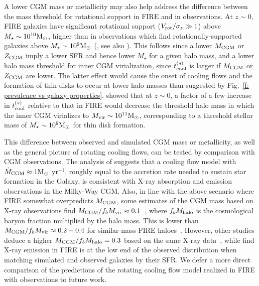 \documentclass[fleqn,usenatbib]{mnras}
\newcommand{\Mdot}{\dot{M}}
\newcommand{\msun}{{\rm M}_\odot}
\begin{document}
A lower CGM mass or metallicity may also help address the difference between the mass threshold for rotational support in FIRE and in observations. 
At $z\sim0$, FIRE galaxies have significant rotational support ($V_{\rm rot}/\sigma_z \gg 1$) above $M_\star\sim10^{10}\msun$, higher than in observations which find rotationally-supported galaxies above $M_\star\sim10^9\msun$ (\citealt{Wheeler16, El-Badry2018a, El-Badry2018}, see also \citealt{Peebles2020}).
This follows since a lower $M_{\rm CGM}$ or $Z_{\rm CGM}$ imply a lower SFR and hence lower $M_\star$ for a given halo mass, and a lower halo mass threshold for inner CGM virialization, since $t_{\rm cool}^{(s)}$ is larger if $M_{\rm CGM}$ or $Z_{\rm CGM}$ are lower. 
The latter effect would cause the onset of cooling flows and the formation of thin disks to occur at lower halo masses than suggested by Fig.~\ref{f: prevalence vs galaxy properties}.
\cite{Stern2021} showed that at $z\sim0$, a factor of a few increase in $t_{\rm cool}^{(s)}$ relative to that in FIRE would decrease the threshold halo mass in which the inner CGM virializes to $M_{\rm vir}\sim10^{11}\msun$, corresponding to a threshold stellar mass of $M_\star\sim10^9\msun$ for thin disk formation.

This difference between observed and simulated CGM mass or metallicity, as well as the general picture of rotating cooling flows, can be tested by comparison with CGM observations. 
The analysis of \cite{Stern2019} suggests that a cooling flow model with $\Mdot_{\rm CGM}\approx1\msun$ yr$^{-1}$, roughly equal to the accretion rate needed to sustain star formation in the Galaxy, is consistent with X-ray absorption and emission observations in the Milky-Way CGM.
Also, in line with the above scenario where FIRE somewhat overpredicts $M_{\rm CGM}$, some estimates of the CGM mass based on X-ray observations find $M_{\rm CGM}/f_bM_{\rm vir} \approx 0.1$~\citep[][]{Li2018, Bregman2018}, where $f_b M_{\rm halo}$ is the cosmological baryon fraction multiplied by the halo mass.
This is lower than  $M_{\rm CGM}/f_bM_{\rm vir} \approx 0.2-0.4$ for similar-mass FIRE haloes~\citep{Hafen2019}.
However, other studies deduce a higher $M_{\rm CGM}/f_bM_{\rm halo}=0.3$ based on the same X-ray data~\citep{Faerman2020}, while \cite{Chan2021} find X-ray emission in FIRE is at the low end of the observed distribution when matching simulated and observed galaxies by their SFR.
We defer a more direct comparison of the predictions of the rotating cooling flow model realized in FIRE with observations to future work.
\end{document}
